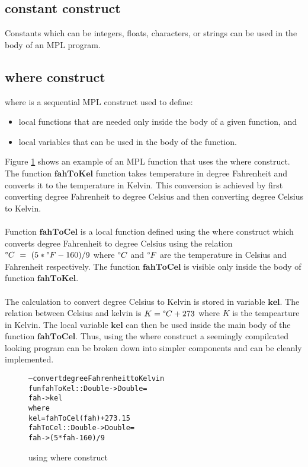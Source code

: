 \documentclass[11pt]{article}
\begin{document}
\subsection {constant construct}
Constants which can be integers, floats, characters, or strings can be used in the body of an MPL program.
\subsection {where construct}
{\sf where} is a sequential MPL construct used to define:
\begin{itemize}
\item local functions that are needed only inside the body of a given function, and
\item local variables that can be used in the body of the function.
\end{itemize}
Figure \ref {seqMPL:whereExam} shows an example of an MPL function that uses 
the {\sf where} construct. 
The function $\mathbf{fahToKel}$ function takes temperature in degree Fahrenheit and converts it to the temperature in Kelvin. This conversion is achieved by first converting degree Fahrenheit to degree Celsius and then converting degree Celsius to Kelvin.
~~\\~~\\ 
Function $\mathbf{fahToCel}$ is a local function defined using the {\sf where} construct which converts degree Fahrenheit to degree Celsius using the relation $\degree C~=~(5*\degree F - 160)/9$ where $\degree C$ and $\degree F$ are the temperature in Celsius and Fahrenheit respectively. The function $\mathbf{fahToCel}$ is visible only inside the body of function $\mathbf{fahToKel}$. 
~~\\~~\\ 
The calculation to convert degree Celsius to Kelvin is stored in variable $\mathbf{kel}$. The relation between Celsius and kelvin is $K = \degree C + 273$ where $K$ is the tempearture in Kelvin. The local variable $\mathbf{kel}$ can then be used inside the main body of the function $\mathbf{fahToCel}$. Thus, using the {\sf where} construct a seemingly compilcated looking program can be broken down into simpler components and can be cleanly implemented.
\begin{figure}[!h]
\begin{alltt}
                -- convert degree Fahrenheit to Kelvin
                fun fahToKel :: Double -> Double =
                  fah -> kel 
                      where
                        kel = fahToCel(fah) + 273.15
                        fahToCel :: Double -> Double =
                            fah -> (5*fah - 160)/9
\end{alltt} 
\caption{using where construct}
\label{seqMPL:whereExam}
\end{figure} 
\end{document}

